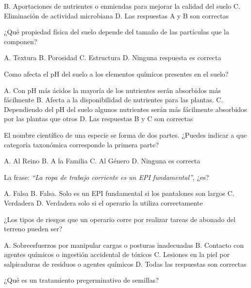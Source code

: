 \documentclass[11pt]{exam}
\begin{document}
{\begin{questions}
\begin{checkboxes}
    \choice B. Aportaciones de nutrientes o enmiendas para mejorar la calidad del suelo
    \choice C. Eliminación de actividad microbiana
    \CorrectChoice D. Las respuestas A y B son correctas
  \end{checkboxes}
\question ¿Qué propiedad física del suelo depende del tamaño de las partículas que la
  componen?
  \begin{checkboxes}
    \CorrectChoice A. Textura
    \choice B. Porosidad
    \choice C. Estructura
    \choice D. Ninguna respuesta es correcta
  \end{checkboxes}
\question Como afecta el pH del suelo a los elementos químicos presentes en el suelo?
  \begin{checkboxes}
    \choice A. Con pH más ácidos la mayoría de los nutrientes serán absorbidos más
    fácilmente
    \choice B. Afecta a la disponibilidad de nutrientes para las plantas.
    \choice C. Dependiendo del pH del suelo algunos nutrientes serán más fácilmente
    absorbidos por las plantas que otros
    \CorrectChoice D. Las respuestas B y C son correctas
  \end{checkboxes}
\question El nombre científico de una especie se forma de dos partes. ¿Puedes
indicar a que categoría taxonómica corresponde la primera parte?
\begin{checkboxes}
  \choice A. Al Reino
  \choice B. A la Familia
  \CorrectChoice C. Al Género
  \choice D. Ninguna es correcta
\end{checkboxes}
\question La frase: \emph{``La ropa de trabajo corriente es un EPI fundamental''}, ¿es?
  \begin{checkboxes}
    \CorrectChoice A. Falsa
    \choice B. Falsa. Solo es un EPI fundamental si los pantalones son largos
    \choice C. Verdadera
    \choice D. Verdadera solo si el operario la utiliza correctamente
  \end{checkboxes}
  \newpage
\question ¿Los tipos de riesgos que un operario corre por  realizar tareas de abonado del
  terreno pueden ser?
  \begin{checkboxes}
    \choice A. Sobreesfuerzos por manipular cargas o posturas inadecuadas
    \choice B. Contacto con agentes químicos o ingestión accidental de tóxicos
    \choice C. Lesiones en la piel por salpicaduras de residuos o agentes químicos
    \CorrectChoice D. Todas las respuestas son correctas
  \end{checkboxes}
\question ¿Qué es un tratamiento pregerminativo de semillas?
  \begin{checkboxes}

\end{checkboxes}
\end{questions}}
\end{document}
